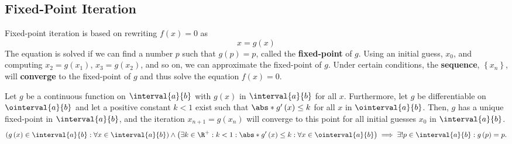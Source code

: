 \documentclass{article}
\begin{document}
\subsection{Fixed-Point Iteration}
Fixed-point iteration is based on rewriting \(f\left( x \right) = 0\)
as
\begin{equation*}
    x = g\left( x \right)
\end{equation*}
The equation is solved if we can find a number \(p\) such that
\(g\left( p \right) = p\), called the \textbf{fixed-point} of \(g\).
Using an initial guess, \(x_0\), and computing \(x_2 = g\left( x_1
\right)\), \(x_3 = g\left( x_2 \right)\), and so on, we can approximate
the fixed-point of \(g\). Under certain conditions, the
\textbf{sequence}, \(\left\{ x_n \right\}\), will \textbf{converge} to
the fixed-point of \(g\) and thus solve the equation \(f\left( x
\right) = 0\).
\begin{theorem}
    Let \(g\) be a continuous function on \(\interval{a}{b}\) with
    \(g\left( x \right)\) in \(\interval{a}{b}\) for all \(x\).
    Furthermore, let \(g\) be differentiable on \(\ointerval{a}{b}\)
    and let a positive constant \(k < 1\) exist such that
    \(\abs*{g'\left( x \right)} \leq k\) for all \(x\) in
    \(\ointerval{a}{b}\). Then, \(g\) has a unique fixed-point in
    \(\interval{a}{b}\), and the iteration
    \(x_{n+1} = g\left( x_n \right)\) will converge to this point for
    all initial guesses \(x_0\) in \(\interval{a}{b}\).
    \begin{equation*}
        \left( g\left( x \right) \in \interval{a}{b} : \forall x \in \interval{a}{b} \right) \land \left( \exists k \in \R^+ : k < 1 : \abs*{g'\left( x \right)} \leq k : \forall x \in \ointerval{a}{b} \right) \implies \exists! p \in \interval{a}{b} : g\left( p \right) = p.
    \end{equation*}
\end{theorem}
\end{document}
